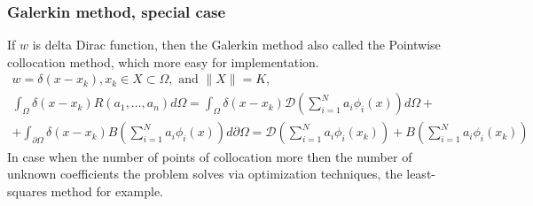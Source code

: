 \subsubsection{Galerkin method, special case}
If $w$ is delta Dirac function, then the Galerkin method also called the Pointwise collocation method, which more easy for implementation.
\begin{equation}
	\begin{multlined}
		w = \delta(x - x_k), x_k \in X \subset \Omega, \text{ and } \| X \| = K, \\
		\int_{\Omega} \delta(x - x_k) R(a_1, \dots, a_n) d\Omega = \int_{\Omega} \delta(x - x_k) \mathcal{D} \left ( \sum_{i = 1}^N a_i \phi_i(x) \right ) d\Omega + \\ + \int_{\partial \Omega} \delta(x - x_k) B \left ( \sum_{i = 1}^N a_i \phi_i(x) \right ) d\partial \Omega
		 = \mathcal{D} \left ( \sum_{i = 1}^N a_i \phi_i(x_k) \right ) + B \left (\sum_{i = 1}^N a_i \phi_i(x_k) \right )
	\end{multlined}
\end{equation}
In case when the number of points of collocation more then the number of unknown coefficients the problem solves via optimization techniques, the least-squares method for example.

